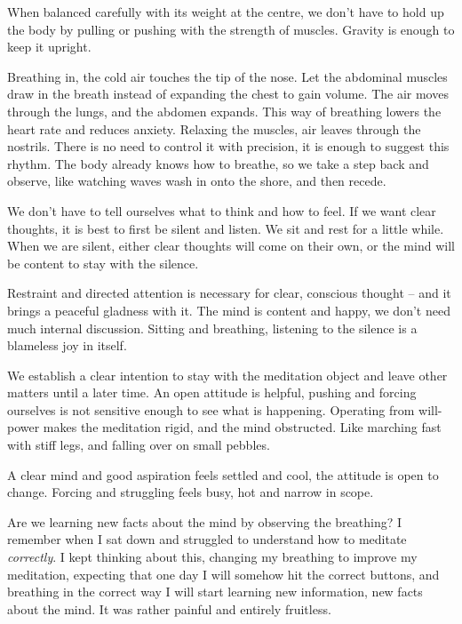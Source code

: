 When balanced carefully with its weight at the centre, we don't have to
hold up the body by pulling or pushing with the strength of muscles.
Gravity is enough to keep it upright.

Breathing in, the cold air touches the tip of the nose. Let the
abdominal muscles draw in the breath instead of expanding the chest to
gain volume. The air moves through the lungs, and the abdomen expands.
This way of breathing lowers the heart rate and reduces anxiety.
Relaxing the muscles, air leaves through the nostrils. There is no need
to control it with precision, it is enough to suggest this rhythm. The
body already knows how to breathe, so we take a step back and observe,
like watching waves wash in onto the shore, and then recede.

We don't have to tell ourselves what to think and how to feel. If we
want clear thoughts, it is best to first be silent and listen. We sit
and rest for a little while. When we are silent, either clear thoughts
will come on their own, or the mind will be content to stay with the
silence.

\enlargethispage*{\baselineskip}

Restraint and directed attention is necessary for clear, conscious
thought -- and it brings a peaceful gladness with it. The mind is
content and happy, we don't need much internal discussion. Sitting and
breathing, listening to the silence is a blameless joy in itself.

We establish a clear intention to stay with the meditation object and
leave other matters until a later time. An open attitude is helpful,
pushing and forcing ourselves is not sensitive enough to see what is
happening. Operating from will-power makes the meditation rigid, and the
mind obstructed. Like marching fast with stiff legs, and falling over on
small pebbles.

A clear mind and good aspiration feels settled and cool, the attitude is
open to change. Forcing and struggling feels busy, hot and narrow in
scope.


Are we learning new facts about the mind by observing the breathing? I
remember when I sat down and struggled to understand how to meditate
\emph{correctly}. I kept thinking about this, changing my breathing to
improve my meditation, expecting that one day I will somehow hit the
correct buttons, and breathing in the correct way I will start learning
new information, new facts about the mind. It was rather painful and
entirely fruitless.

